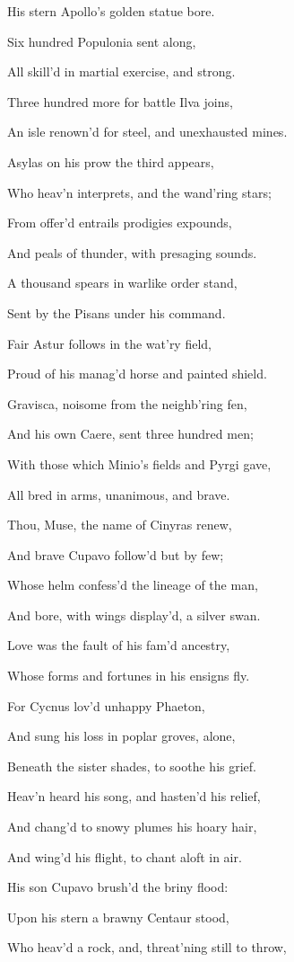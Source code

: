 His stern Apollo’s golden statue bore.

Six hundred Populonia sent along,

All skill’d in martial exercise, and strong.

Three hundred more for battle Ilva joins,

An isle renown’d for steel, and unexhausted mines.

Asylas on his prow the third appears,

Who heav’n interprets, and the wand’ring stars;

From offer’d entrails prodigies expounds,

And peals of thunder, with presaging sounds.

A thousand spears in warlike order stand,

Sent by the Pisans under his command.

Fair Astur follows in the wat’ry field,

Proud of his manag’d horse and painted shield.

Gravisca, noisome from the neighb’ring fen,

And his own Caere, sent three hundred men;

With those which Minio’s fields and Pyrgi gave,

All bred in arms, unanimous, and brave.

Thou, Muse, the name of Cinyras renew,

And brave Cupavo follow’d but by few;

Whose helm confess’d the lineage of the man,

And bore, with wings display’d, a silver swan.

Love was the fault of his fam’d ancestry,

Whose forms and fortunes in his ensigns fly.

For Cycnus lov’d unhappy Phaeton,

And sung his loss in poplar groves, alone,

Beneath the sister shades, to soothe his grief.

Heav’n heard his song, and hasten’d his relief,

And chang’d to snowy plumes his hoary hair,

And wing’d his flight, to chant aloft in air.

His son Cupavo brush’d the briny flood:

Upon his stern a brawny Centaur stood,

Who heav’d a rock, and, threat’ning still to throw,

